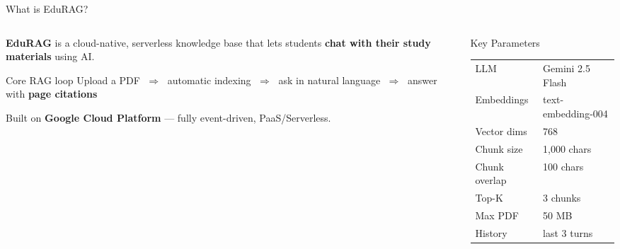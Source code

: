 \documentclass[aspectratio=169]{beamer}
\begin{document}
\begin{frame}[t,shrink=3]{What is EduRAG?}
  \begin{columns}[t]
    \begin{column}{0.55\textwidth}
      \textbf{EduRAG} is a cloud-native, serverless knowledge base that lets
      students \textbf{chat with their study materials} using AI.

      \vspace{0.3cm}
      \begin{block}{Core RAG loop}
        Upload a PDF
        $\;\Rightarrow\;$ automatic indexing
        $\;\Rightarrow\;$ ask in natural language
        $\;\Rightarrow\;$ answer with \textbf{page citations}
      \end{block}

      \vspace{0.25cm}
      {\small Built on \textbf{Google Cloud Platform} —
      fully event-driven, PaaS/Serverless.}
    \end{column}
    \begin{column}{0.41\textwidth}
      \begin{block}{Key Parameters}
        {\footnotesize\renewcommand{\arraystretch}{1.2}
        \begin{tabular}{@{}ll@{}}
          LLM           & Gemini 2.5 Flash \\
          Embeddings    & text-embedding-004 \\
          Vector dims   & 768 \\
          Chunk size    & 1{,}000 chars \\
          Chunk overlap & 100 chars \\
          Top-K         & 3 chunks \\
          Max PDF       & 50 MB \\
          History       & last 3 turns \\
        \end{tabular}}
      \end{block}
    \end{column}
  \end{columns}
\end{frame}
\end{document}
